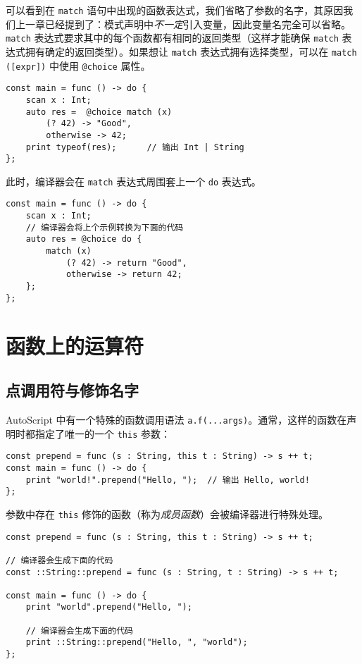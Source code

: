 可以看到在 \lstinline!match! 语句中出现的函数表达式，我们省略了参数的名字，其原因我们上一章已经提到了：模式声明中\emph{不一定}引入变量，因此变量名完全可以省略。 \\

\lstinline!match! 表达式要求其中的每个函数都有相同的返回类型（这样才能确保 \lstinline!match! 表达式拥有确定的返回类型）。如果想让 \lstinline!match! 表达式拥有选择类型，可以在 \lstinline!match ([expr])! 中使用 \lstinline!@choice! 属性。

\begin{lstlisting}
const main = func () -> do {
    scan x : Int;
    auto res =  @choice match (x)
        (? 42) -> "Good",
        otherwise -> 42;
    print typeof(res);      // 输出 Int | String
};
\end{lstlisting}

此时，编译器会在 \lstinline!match! 表达式周围套上一个 \lstinline!do! 表达式。

\begin{lstlisting}
const main = func () -> do {
	scan x : Int;
	// 编译器会将上个示例转换为下面的代码
	auto res = @choice do {
		match (x)
			(? 42) -> return "Good",
			otherwise -> return 42;
	};
};
\end{lstlisting}



\section{函数上的运算符}

\subsection{点调用符与修饰名字}

AutoScript 中有一个特殊的函数调用语法 \lstinline!a.f(...args)!。通常，这样的函数在声明时都指定了唯一的一个 \lstinline!this! 参数：

\begin{lstlisting}
const prepend = func (s : String, this t : String) -> s ++ t;
const main = func () -> do {
    print "world!".prepend("Hello, ");  // 输出 Hello, world!
};
\end{lstlisting}

参数中存在 \lstinline!this! 修饰的函数（称为\emph{成员函数}）会被编译器进行特殊处理。

\begin{lstlisting}
const prepend = func (s : String, this t : String) -> s ++ t;

// 编译器会生成下面的代码
const ::String::prepend = func (s : String, t : String) -> s ++ t;

const main = func () -> do {
    print "world".prepend("Hello, ");

    // 编译器会生成下面的代码
    print ::String::prepend("Hello, ", "world");
};
\end{lstlisting}


